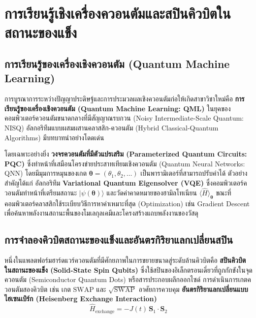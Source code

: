 \section{การเรียนรู้เชิงเครื่องควอนตัมและสปินคิวบิตในสถานะของแข็ง}

\subsection{การเรียนรู้ของเครื่องเชิงควอนตัม (Quantum Machine Learning)}
การบูรณาการระหว่างปัญญาประดิษฐ์และการประมวลผลเชิงควอนตัมก่อให้เกิดสาขาวิชาใหม่คือ \textbf{การเรียนรู้ของเครื่องเชิงควอนตัม (Quantum Machine Learning: QML)} ในยุคของคอมพิวเตอร์ควอนตัมขนาดกลางที่มีสัญญาณรบกวน (Noisy Intermediate-Scale Quantum: NISQ) อัลกอริทึมแบบผสมผสานคลาสสิก-ควอนตัม (Hybrid Classical-Quantum Algorithms) มีบทบาทนำอย่างโดดเด่น

โดยเฉพาะอย่างยิ่ง \textbf{วงจรควอนตัมที่มีตัวแปรเสริม (Parameterized Quantum Circuits: PQC)} ซึ่งทำหน้าที่เสมือนโครงข่ายประสาทเทียมเชิงควอนตัม (Quantum Neural Networks: QNN) โดยมีมุมการหมุนของเกต $\boldsymbol{\theta} = (\theta_1, \theta_2, \dots)$ เป็นพารามิเตอร์ที่สามารถปรับค่าได้ ตัวอย่างสำคัญได้แก่ อัลกอริทึม \textbf{Variational Quantum Eigensolver (VQE)} ซึ่งคอมพิวเตอร์ควอนตัมทำหน้าที่เตรียมสถานะ $|\psi(\boldsymbol{\theta})\rangle$ และวัดค่าคาดหมายของฮามิลโทเนียน $\langle \hat{H} \rangle_{\boldsymbol{\theta}}$ ขณะที่คอมพิวเตอร์คลาสสิกใช้ระเบียบวิธีการหาค่าเหมาะที่สุด (Optimization) เช่น Gradient Descent เพื่อค้นหาพลังงานสถานะพื้นของโมเลกุลเคมีและโครงสร้างแถบพลังงานของวัสดุ

\subsection{การจำลองคิวบิตสถานะของแข็งและอันตรกิริยาแลกเปลี่ยนสปิน}
หนึ่งในแพลตฟอร์มฮาร์ดแวร์ควอนตัมที่มีศักยภาพในการขยายขนาดสู่ระดับล้านคิวบิตคือ \textbf{สปินคิวบิตในสถานะของแข็ง (Solid-State Spin Qubits)} ซึ่งใช้สปินของอิเล็กตรอนเดี่ยวที่ถูกกักขังในจุดควอนตัม (Semiconductor Quantum Dots) หรือสารประกอบผลึกออกไซด์ การดำเนินการเกตควอนตัมสองคิวบิต เช่น เกต $\text{SWAP}$ และ $\sqrt{\text{SWAP}}$ อาศัยการควบคุม \textbf{อันตรกิริยาแลกเปลี่ยนแบบไฮเซนเบิร์ก (Heisenberg Exchange Interaction)}
\begin{equation}
\hat{H}_{\text{exchange}} = -J(t) \, \mathbf{S}_1 \cdot \mathbf{S}_2
\end{equation}

